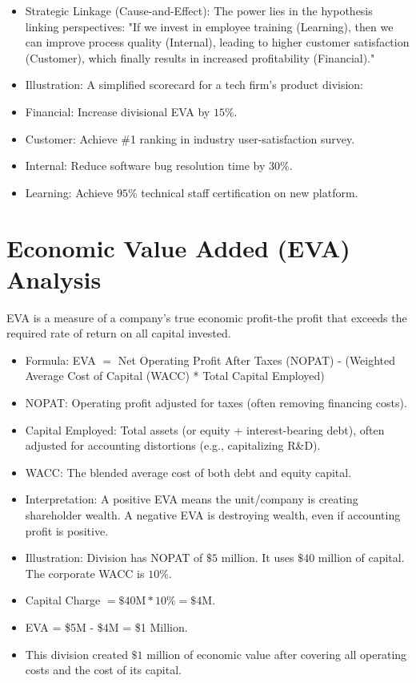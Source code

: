 \documentclass[10pt]{article}
\begin{document}
\begin{itemize}
  \item Strategic Linkage (Cause-and-Effect): The power lies in the hypothesis linking perspectives: "If we invest in employee training (Learning), then we can improve process quality (Internal), leading to higher customer satisfaction (Customer), which finally results in increased profitability (Financial)."
  \item Illustration: A simplified scorecard for a tech firm's product division:
  \item Financial: Increase divisional EVA by $15 \%$.
  \item Customer: Achieve \#1 ranking in industry user-satisfaction survey.
  \item Internal: Reduce software bug resolution time by $30 \%$.
  \item Learning: Achieve $95 \%$ technical staff certification on new platform.
\end{itemize}

\section*{Economic Value Added (EVA) Analysis}
EVA is a measure of a company's true economic profit-the profit that exceeds the required rate of return on all capital invested.

\begin{itemize}
  \item Formula: EVA $=$ Net Operating Profit After Taxes (NOPAT) - (Weighted Average Cost of Capital (WACC) * Total Capital Employed)
  \item NOPAT: Operating profit adjusted for taxes (often removing financing costs).
  \item Capital Employed: Total assets (or equity + interest-bearing debt), often adjusted for accounting distortions (e.g., capitalizing R\&D).
  \item WACC: The blended average cost of both debt and equity capital.
  \item Interpretation: A positive EVA means the unit/company is creating shareholder wealth. A negative EVA is destroying wealth, even if accounting profit is positive.
  \item Illustration: Division has NOPAT of $\$ 5$ million. It uses $\$ 40$ million of capital. The corporate WACC is $10 \%$.
  \item Capital Charge $=\$ 40 \mathrm{M} * 10 \%=\$ 4 \mathrm{M}$.
  \item EVA = \$5M - \$4M = \$1 Million.
  \item This division created $\$ 1$ million of economic value after covering all operating costs and the cost of its capital.
\end{itemize}
\end{document}
